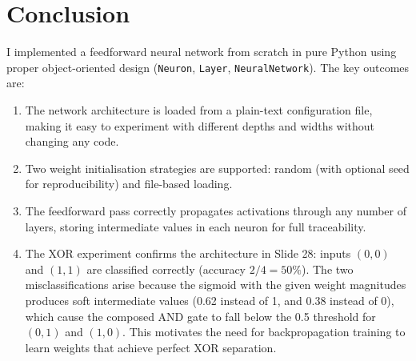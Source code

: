 \documentclass[12pt,a4paper]{article}
\begin{document}
\section{Conclusion}

I implemented a feedforward neural network from scratch in pure Python using
proper object-oriented design (\texttt{Neuron}, \texttt{Layer},
\texttt{NeuralNetwork}).
The key outcomes are:

\begin{enumerate}
    \item The network architecture is loaded from a plain-text configuration
          file, making it easy to experiment with different depths and widths
          without changing any code.
    \item Two weight initialisation strategies are supported: random (with
          optional seed for reproducibility) and file-based loading.
    \item The feedforward pass correctly propagates activations through any
          number of layers, storing intermediate values in each neuron for
          full traceability.
    \item The XOR experiment confirms the architecture in Slide 28:
          inputs $(0,0)$ and $(1,1)$ are classified correctly (accuracy
          $2/4 = 50\%$).
          The two misclassifications arise because the sigmoid with the given
          weight magnitudes produces soft intermediate values (0.62 instead of
          1, and 0.38 instead of 0), which cause the composed AND gate to fall
          below the 0.5 threshold for $(0,1)$ and $(1,0)$.
          This motivates the need for backpropagation training to learn weights
          that achieve perfect XOR separation.
\end{enumerate}
\end{document}
